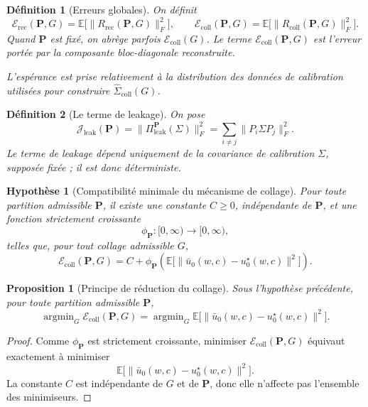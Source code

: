 \documentclass[11pt,a4paper]{article}
\newtheorem{definition}{Définition}[section]
\newtheorem{assumption}{Hypothèse}[section]
\newtheorem{proposition}{Proposition}[section]
\DeclareMathOperator{\argmin}{argmin}
\newcommand{\1}{\mathbf 1}
\begin{document}
\begin{definition}[Erreurs globales]
On définit
\[
\mathcal E_{\mathrm{rec}}(\mathbf P,G)
=
\mathbb E\bigl[\|R_{\mathrm{rec}}(\mathbf P,G)\|_F^2\bigr],
\qquad
\mathcal E_{\mathrm{coll}}(\mathbf P,G)
=
\mathbb E\bigl[\|R_{\mathrm{coll}}(\mathbf P,G)\|_F^2\bigr].
\]
Quand \(\mathbf P\) est fixé, on abrège parfois \(\mathcal E_{\mathrm{coll}}(G)\).
Le terme \(\mathcal E_{\mathrm{coll}}(\mathbf P,G)\) est l'erreur portée par la composante bloc-diagonale reconstruite.

L'espérance est prise relativement à la distribution des données de calibration utilisées pour construire
\(\widehat \Sigma_{\mathrm{coll}}(G)\).
\end{definition}

\begin{definition}[Le terme de leakage]
On pose
\[
\mathcal J_{\mathrm{leak}}(\mathbf P)
=
\bigl\|\Pi_{\mathrm{leak}}^{\mathbf P}(\Sigma)\bigr\|_F^2
=
\sum_{i\neq j}\|P_i\Sigma P_j\|_F^2.
\]
Le terme de leakage dépend uniquement de la covariance de calibration \(\Sigma\), supposée fixée ; il est donc déterministe.
\end{definition}

\begin{assumption}[Compatibilité minimale du mécanisme de collage]
Pour toute partition admissible \(\mathbf P\), il existe une constante \(C\ge 0\), indépendante de \(\mathbf P\), et une fonction strictement croissante
\[
\phi_{\mathbf P}:[0,\infty)\to[0,\infty),
\]
telles que, pour tout collage admissible \(G\),
\[
\mathcal E_{\mathrm{coll}}(\mathbf P,G)
=
C
+
\phi_{\mathbf P}\!\left(\mathbb E\bigl[\|\bar u_0(w,c)-u_0^\star(w,c)\|^2\bigr]\right).
\]
\end{assumption}

\begin{proposition}[Principe de réduction du collage]
Sous l'hypothèse précédente, pour toute partition admissible \(\mathbf P\),
\[
\argmin_G \mathcal E_{\mathrm{coll}}(\mathbf P,G)
=
\argmin_G \mathbb E\bigl[\|\bar u_0(w,c)-u_0^\star(w,c)\|^2\bigr].
\]
\end{proposition}

\begin{proof}
Comme \(\phi_{\mathbf P}\) est strictement croissante, minimiser \(\mathcal E_{\mathrm{coll}}(\mathbf P,G)\) équivaut exactement à minimiser
\[
\mathbb E\bigl[\|\bar u_0(w,c)-u_0^\star(w,c)\|^2\bigr].
\]
La constante \(C\) est indépendante de \(G\) et de \(\mathbf P\), donc elle n'affecte pas l'ensemble des minimiseurs.
\end{proof}
\end{document}
